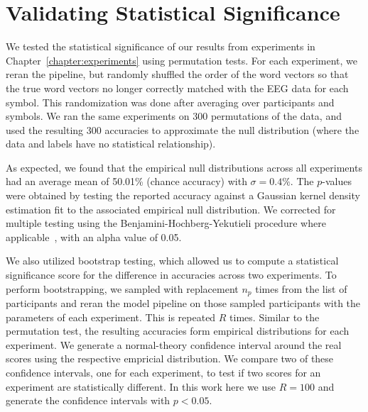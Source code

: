 \section{Validating Statistical Significance}
We tested the statistical significance of our results from experiments in 
Chapter~\ref{chapter:experiments} using permutation tests. For each experiment, 
we reran the pipeline, but randomly shuffled the order of the word vectors so 
that the true word vectors no longer correctly matched with the EEG data for 
each symbol. This randomization was done after averaging over participants and 
symbols. We ran the same experiments on 300 permutations of the data, and used 
the resulting 300 \tvt accuracies to approximate the null distribution (where 
the data and labels have no statistical relationship). 

As expected, we found that the empirical null distributions across all 
experiments had an average mean of 50.01\% (chance accuracy) with $\sigma = 
0.4\%$. The $p$-values were obtained by testing the reported accuracy against a 
Gaussian kernel density estimation fit to the associated empirical null 
distribution. We corrected for multiple testing using the 
Benjamini-Hochberg-Yekutieli procedure where 
applicable~\cite{benjamini2001control}, with an alpha value of 0.05.

We also utilized bootstrap testing, which allowed us to compute a statistical 
significance score for the difference in \tvt accuracies across two 
experiments. To perform bootstrapping, we sampled with replacement $n_p$ times 
from the list of participants and reran the model pipeline on those sampled 
participants with the parameters of each experiment. This is repeated $R$ 
times.  Similar to the permutation test, the resulting \tvt accuracies form 
empirical distributions for each experiment. We generate a normal-theory 
confidence interval around the real \tvt scores using the respective empricial 
distribution. We compare two of these confidence intervals, one for each 
experiment, to test if two \tvt scores for an experiment are statistically 
different. In this work here we use $R = 100$ and generate the confidence 
intervals with $p < 0.05$.
